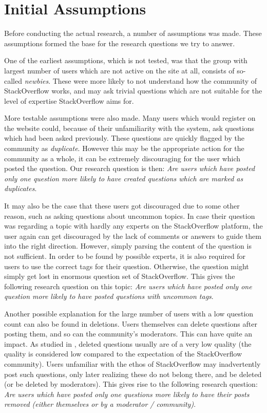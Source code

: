\documentclass[conference]{IEEEtran}
\begin{document}
\section{Initial Assumptions} \label{InitialAssumptions}

Before conducting the actual research, a number of assumptions was made. These
assumptions formed the base for the research questions we try to answer.

One of the earliest assumptions, which is not tested, was that the group with
largest number of users which are not active on the site at all, consists of
so-called \textit{newbies}. These were more likely to not understand how the
community of StackOverflow works, and may ask trivial questions which are not
suitable for the level of expertise StackOverflow aims for.

More testable assumptions were also made. Many users which would register on
the website could, because of their unfamiliarity with the system, ask
questions which had been asked previously. These questions are quickly flagged
by the community as \textit{duplicate}. However this may be the appropriate
action for the community as a whole, it can be extremely discouraging for the
user which posted the question. Our research question is then: \textit{Are
users which have posted only one question more likely to have created questions
which are marked as duplicates}.

It may also be the case that these users got discouraged due to some other
reason, such as asking questions about uncommon topics. In case their question
was regarding a topic with hardly any experts on the StackOverflow platform,
the user again can get discouraged by the lack of comments or answers to guide
them into the right direction. However, simply parsing the content of the
question is not sufficient. In order to be found by possible experts, it is
also required for users to use the correct tags for their question. Otherwise,
the question might simply get lost in enormous question set of StackOverflow.
This gives the following research question on this topic: \textit{Are users
which have posted only one question more likely to have posted questions with
uncommon tags}.

Another possible explanation for the large number of users with a low question
count can also be found in deletions. Users themselves can delete questions
after posting them, and so can the community's moderators. This can have quite
an impact. As studied in \cite{correa2014chaff}, deleted questions usually are
of a very low quality (the quality is considered low compared to the
expectation of the StackOverflow community). Users unfamiliar with the ethos of
StackOverflow may inadvertently post such questions, only later realizing these
do not belong there, and be deleted (or be deleted by moderators). This gives
rise to the following research question: \textit{Are users which have posted
only one questions more likely to have their posts removed (either themselves
or by a moderator / community)}.
\end{document}
